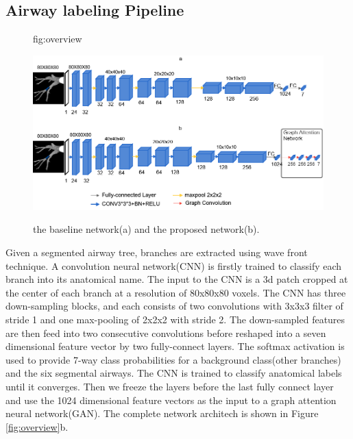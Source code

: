 \documentclass{midl} %
\begin{document}
\subsection{Airway labeling Pipeline}
\begin{figure}[htbp]
\floatconts
{fig:overview}
  {\caption{the baseline network(a) and the proposed network(b).}}
  {\includegraphics[width=0.95\linewidth]{resources/gnn_baseline.png}}
\end{figure}
Given a segmented airway tree, branches are extracted using wave front technique\cite{van2008robust}. A convolution neural network(CNN) is firstly trained to classify each branch into its anatomical name. The input to the CNN is a 3d patch cropped at the center of each branch at a resolution of 80x80x80 voxels. The CNN has three down-sampling blocks, and each consists of two convolutions with 3x3x3 filter of stride 1 and one max-pooling of 2x2x2 with stride 2. The down-sampled features are then feed into two consecutive convolutions before reshaped into a seven dimensional feature vector by two fully-connect layers. The softmax activation is used to provide 7-way class probabilities for a background class(other branches) and the six segmental airways.
The CNN is trained to classify anatomical labels until it converges. Then we freeze the layers before the last fully connect layer and use the 1024 dimensional feature vectors as the input to a graph attention neural network(GAN). The complete network architech is shown in Figure \ref{fig:overview}b.   
\end{document}
